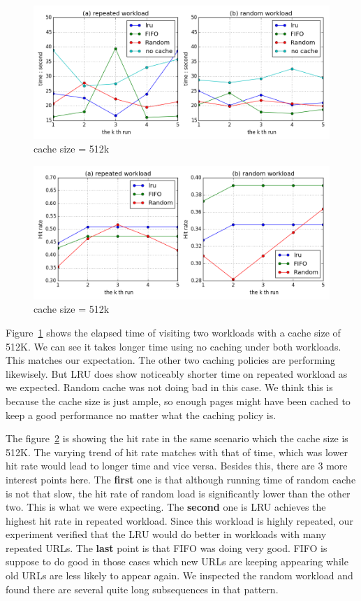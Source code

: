\documentclass[paper=a4, fontsize=11pt]{scrartcl} %
\numberwithin{equation}{section} %
\numberwithin{figure}{section} %
\numberwithin{table}{section} %
\begin{document}
\begin{figure}[h]
  \centering
  \includegraphics[width=\textwidth]{../data/time512k}
  \caption{cache size = 512k}
  \label{fig:time512k}
\end{figure}
\begin{figure}[h]
  \centering
  \includegraphics[width=\textwidth]{../data/hit512k}
  \caption{cache size = 512k}
  \label{fig:hit512k}
\end{figure}
Figure~\ref{fig:time512k} shows the elapsed time of visiting two workloads with a cache size of 512K. We can see it takes longer time using no caching under both workloads. This matches our expectation. The other two caching policies are performing likewisely. But LRU does show noticeably shorter time on repeated workload as we expected. Random cache was not doing bad in this case. We think this is because the cache size is just ample, so enough pages might have been cached to keep a good performance no matter what the caching policy is. 

\vspace{1em}

The figure~\ref{fig:hit512k} is showing the hit rate in the same scenario which the cache size is 512K. The varying trend of hit rate matches with that of time, which was lower hit rate would lead to longer time and vice versa. Besides this, there are 3 more interest points here. The 
\textbf{first} one is that although running time of random cache is not that slow, the hit rate of random load is significantly lower than the other two. This is what we were expecting. 
The \textbf{second} one is LRU achieves the highest hit rate in repeated workload. Since this workload is highly repeated, our experiment verified that the LRU would do better in workloads with many repeated URLs. 
The \textbf{last} point is that FIFO was doing very good. FIFO is suppose to do good in those cases which new URLs are keeping appearing while old URLs are less likely to appear again. We inspected the random workload and found there are several quite long subsequences in that pattern.
\end{document}

